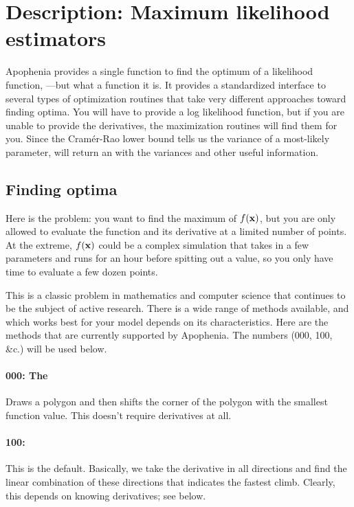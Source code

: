 \section{Description: Maximum likelihood estimators} 
Apophenia provides a single function to find the optimum of a likelihood
function, ---but what a function it is. It
provides a standardized interface to several types of optimization
routines that take very different approaches toward finding optima. You
will have to provide a log likelihood function, but if you are unable to
provide the derivatives, the maximization routines will find them for
you. Since the Cram\'er-Rao lower bound tells us the variance of a
most-likely parameter,  will return an
 with the variances and other useful information.


\subsection{Finding optima} Here is the problem: you want to find the
maximum of $f({\bf x})$, but you are only allowed to evaluate the function
and its derivative at a limited number of points. At the extreme,
$f({\bf x})$ could be a complex simulation that takes in a few parameters
and runs for an hour before spitting out a value, so you only have time
to evaluate a few dozen points.

This is a classic problem in mathematics and computer science that
continues to be the subject of active research. There is a wide range of
methods available, and which works best for your model depends on its
characteristics. Here are the methods
that are currently supported by Apophenia. The numbers (000, 100, \&c.)
will be used below.

\paragraph{000: The } Draws a polygon and
then shifts the corner of the polygon with the smallest function value.
This doesn't require derivatives at all.

\paragraph{100: } This is the
default. Basically, we take the derivative in all directions and find
the linear combination of these directions that indicates the fastest
climb. Clearly, this depends on knowing derivatives; see below.

